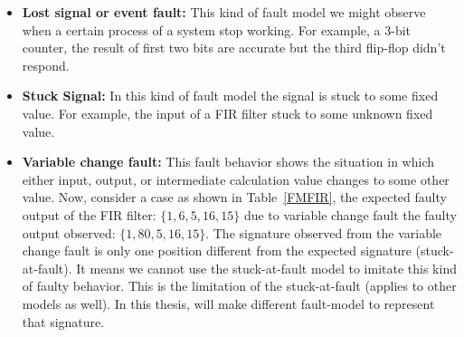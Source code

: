 \begin{itemize}

\item \textbf{Lost signal or event fault:} This kind of fault model we might observe when a certain process of a system stop working. For example, a 3-bit counter, the result of first two bits are accurate but the third flip-flop didn't respond.




\item \textbf{Stuck Signal:} In this kind of fault model the signal is stuck to some fixed value. For example, the input of a FIR filter stuck to some unknown fixed value. 

 

\item \textbf{Variable change fault:} This fault behavior shows the situation in which either input, output, or intermediate calculation value changes to some other value. Now, consider a case as shown in Table~\ref{FMFIR}, the expected faulty output of the FIR filter: $\{1, 6, 5, 16, 15\}$ due to variable change fault the faulty output observed: $\{1, 80, 5, 16, 15\}$. The signature observed from the variable change fault is only one position different from the expected signature (stuck-at-fault).  It means we cannot use the stuck-at-fault model to imitate this kind of faulty behavior. This is  the limitation of the stuck-at-fault (applies to other models as well). In this thesis, will make different fault-model to represent that signature.


\begin{table}[tb!]
\center
\caption{Variable Change Fault Models FIR}

\label{FMFIR}
\end{table}
\end{itemize}

